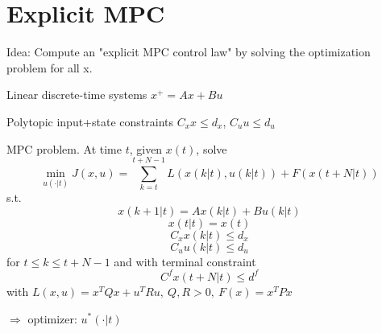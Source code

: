 \section{Explicit MPC}

Idea: Compute an "explicit MPC control law" by solving the optimization problem for all x.

Linear discrete-time systems $x^+=Ax+Bu$

Polytopic input+state constraints $C_xx \leq d_x$,  $C_uu \leq d_u$

MPC problem. At time $t$, given $x(t)$, solve
\begin{equation*}
\min_{u(\cdot|t)}J(x,u) = \sum_{k=t}^{t+N-1}L(x(k|t),u(k|t)) + F(x(t+N|t))
\end{equation*}
s.t.
\begin{equation*}
x(k+1|t) = Ax(k|t) + Bu(k|t)
\end{equation*}
\begin{equation*}
x(t|t) = x(t)
\end{equation*}
\begin{equation*}
C_xx(k|t) \leq d_x
\end{equation*}
\begin{equation*}
C_uu(k|t) \leq d_u
\end{equation*}
for $ t \leq k \leq t+N-1$ and with terminal constraint
\begin{equation*}
C^fx(t+N|t) \leq d^f
\end{equation*}
with $L(x,u) = x^TQx + u^TRu, \ Q,R > 0, \ F(x) = x^TPx$

$\Rightarrow$ optimizer: $u^*(\cdot|t)$

